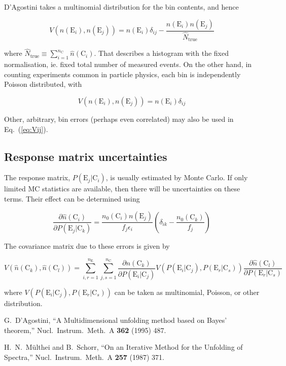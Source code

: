 \documentclass[12pt,a4paper]{article}
\newcommand{\E}{\mathrm{E}}
\newcommand{\C}{\mathrm{C}}
\newcommand{\dd}[2]{\frac{\partial{#1}}{\partial{#2}}}
\begin{document}
D'Agostini takes a multinomial distribution for the bin contents, and hence

\begin{equation}
V(n(\E_i),n(\E_j)) = n(\E_i) \delta_{ij} - \frac{n(\E_i) n(\E_j)}{\hat{N}_{\mathrm{true}}}
\end{equation}

where $\hat{N}_{\mathrm{true}} \equiv \sum_{i=1}^{n_{\C}} \hat{n}(\C_i)$.
That describes a histogram with the fixed normalisation, ie. fixed total number of measured events.
On the other hand, in counting experiments common in particle physics, each bin is independently Poisson distributed, with

\begin{equation}
V(n(\E_i),n(\E_j)) = n(\E_i) \delta_{ij}
\end{equation}

Other, arbitrary, bin errors (perhaps even correlated) may also be used in Eq.~(\ref{eq:Vij}).

\subsection{Response matrix uncertainties}

The response matrix, $P(\E_j|\C_i)$, is usually estimated by Monte Carlo. If only limited MC statistics
are available, then there will be uncertainties on these terms. Their effect can be determined using

\begin{equation}
\dd{\hat{n}(\C_i)}{P(\E_j|\C_k)} = \frac{n_0(\C_i) n(\E_j)}{f_j \epsilon_i} \left( \delta_{ik} - \frac{n_0(\C_k)}{f_j} \right)
\end{equation}

The covariance matrix due to these errors is given by

\begin{equation}
V(\hat{n}(\C_k),\hat{n}(\C_l)) = \sum_{i,r=1}^{n_{\E}} \sum_{j,s=1}^{n_{\C}} \dd{\hat{n}(\C_k)}{P(\E_i|\C_j)} V(P(\E_i|\C_j),P(\E_r|\C_s)) \dd{\hat{n}(\C_l)}{P(\E_r|\C_s)}
\end{equation}

where $V(P(\E_i|\C_j),P(\E_r|\C_s))$ can be taken as multinomial, Poisson, or other distribution.

\begin{thebibliography}{99}

  G.~D'Agostini,
  ``A Multidimensional unfolding method based on Bayes' theorem,''
  Nucl.\ Instrum.\ Meth.\  A {\bf 362} (1995) 487.

  H.~N.~M\"ulthei and B.~Schorr,
  ``On an Iterative Method for the Unfolding of Spectra,''
  Nucl.\ Instrum.\ Meth.\  A {\bf 257} (1987) 371.

\end{thebibliography}
\end{document}
